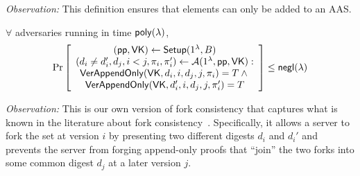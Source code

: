 \noindent \textit{Observation:}
This definition ensures that elements can only be added to an AAS.

\begin{definition}
\label{def:aas:fork-consistency}
$\forall$ adversaries \Adv running in time $\mathsf{poly}(\lambda)$,
\begin{align*}
\Pr \left[ \begin{array}{c}
(\mathsf{pp},\mathsf{VK}) \leftarrow \mathsf{Setup}(1^\lambda, B)\\
(d_i\ne d_i',d_j,i<j,\pi_i,\pi_i') \leftarrow \mathcal{A}(1^\lambda, \mathsf{pp}, \mathsf{VK})
: \\
{\mathsf{VerAppendOnly}(\mathsf{VK}, d_i , i, d_j, j, \pi_i) = T} \wedge {}\\
{\mathsf{VerAppendOnly}(\mathsf{VK}, d_i', i, d_j, j, \pi_i') = T}\\
\end{array} \right] \le \mathsf{negl}(\lambda)
\end{align*}
\end{definition}

\noindent \textit{Observation:}
This is our own version of fork consistency that captures what is known in the literature about fork consistency~\cite{ht,LM07Beyond}.
Specifically, it allows a server to fork the set at version $i$ by presenting two different digests $d_i$ and $d_i'$ and prevents the server from forging append-only proofs that ``join'' the two forks into some common digest $d_j$ at a later version $j$.
